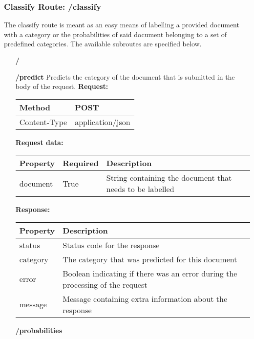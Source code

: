 \subsubsection{Classify Route: /classify}
The classify route is meant as an easy means of labelling a provided document with a category or the probabilities of said document belonging to a set of predefined categories.
The available subroutes are specified below.
\begin{enumerate}
\item[\textbf{/}]
\item[\textbf{/predict}]
Predicts the category of the document that is submitted in the body of the request.
\newline
\newline
\textbf{Request:}
\newline
\newline
\begin{tabular}{ | l | l |}
\hline
Method & POST\\ \hline
Content-Type & application/json\\ \hline
\end{tabular}
\newline
\newline
\textbf{Request data:}
\newline
\newline
\begin{tabular}{ | l | l | l |}
\hline
\textbf{Property} & \textbf{Required} & \textbf{Description}\\ \hline
document & True & String containing the document that needs to be labelled\\ \hline
\end{tabular}
\textbf{Response:}
\newline
\newline
\begin{tabular}{ | l | l |}
\hline
\textbf{Property} & \textbf{Description}\\ \hline
status & Status code for the response\\ \hline
category & The category that was predicted for this document\\ \hline
error & Boolean indicating if there was an error during the processing of the request\\ \hline
message & Message containing extra information about the response\\ \hline
\end{tabular}
\item[\textbf{/probabilities}]

\end{enumerate}
